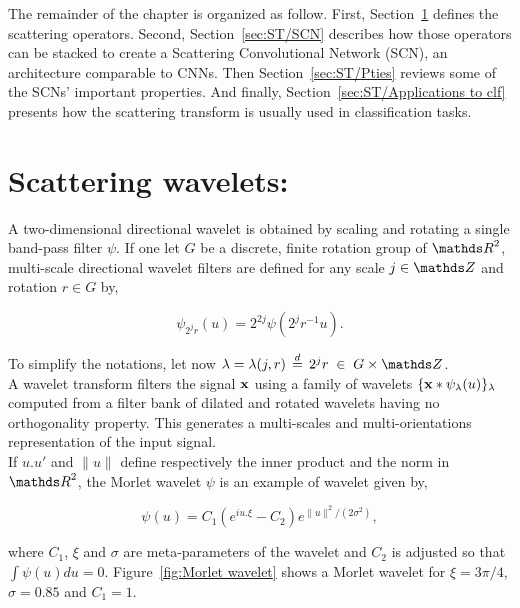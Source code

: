 \documentclass[a4paper,11pt]{report}
\begin{document}
	The remainder of the chapter is organized as follow. First, Section~\ref{sec:ST/Scattering wavelets} defines the scattering operators. Second, Section~\ref{sec:ST/SCN} describes how those operators can be stacked to create a Scattering Convolutional Network (SCN), an architecture comparable to CNNs. Then Section~\ref{sec:ST/Pties} reviews some of the SCNs' important properties. And finally, Section~\ref{sec:ST/Applications to clf} presents how the scattering transform is usually used in classification tasks.
	      
		\section{Scattering wavelets:}
			\label{sec:ST/Scattering wavelets}

			A two-dimensional directional wavelet is obtained by scaling and rotating a single band-pass filter $\psi$. If one let $G$ be a discrete, finite rotation group of $\dsR^{2}$, multi-scale directional wavelet filters are defined for any scale $j \in \dsZ$ and rotation $r \in G$ by,
      
      \begin{equation}
				\label{eq:multi-scale directional wavelet}
				\psi_{2^{j}r}(u) = 2^{2j} \psi(2^{j}r^{-1}u).
      \end{equation}
      
      To simplify the notations, let now $\lambda = \lambda(j,r) \; \eqdef \; 2^{j}r \; \in \; G \times \dsZ$.\\
      
      A wavelet transform filters the signal ${\bf x}$ using a family of wavelets $\{{\bf x} \ast \psi_{\lambda}(u)\}_{\lambda}$ computed from a filter bank of dilated and rotated wavelets having no orthogonality property. This generates a multi-scales and multi-orientations representation of the input signal.\\ 
      
      If $u.u'$ and $\|u\|$ define respectively the inner product and the norm in $\dsR^{2}$, the Morlet wavelet $\psi$ is an example of wavelet given by,
      
      \begin{equation*} 
				\label{eq:Morlet wavelet}
				\psi(u) = C_{1}(e^{iu.\xi} - C_{2}) e^{\|u\|^{2}/(2 \sigma^{2})},
      \end{equation*}

      where $C_{1}$, $\xi$ and $\sigma$ are meta-parameters of the wavelet and $C_{2}$ is adjusted so that $\int \psi(u) du = 0$. Figure~\ref{fig:Morlet wavelet} shows a Morlet wavelet for  $\xi= 3\pi/4$, $\sigma=0.85$ and $C_{1}=1$.\\
      
\end{document}
